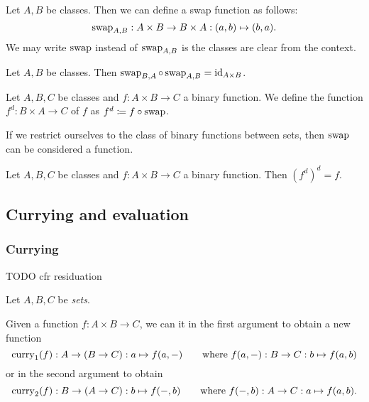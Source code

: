 Let $A,B$ be classes. Then we can define a swap function as follows:
\[ \operatorname{swap}_{A,B}: A\times B \to B\times A: (a,b) \mapsto (b,a). \]
We may write $\operatorname{swap}$ instead of $\operatorname{swap}_{A,B}$ is the classes are clear from the context.

\begin{lemma}
Let $A, B$ be classes. Then $\operatorname{swap}_{B,A}\circ \operatorname{swap}_{A,B} = \operatorname{id}_{A\times B}$.
\end{lemma}

\begin{definition}
Let $A, B, C$ be classes and $f: A\times B \to C$ a binary function. We define the  function $f^d: B\times A \to C$ of $f$ as $f^d \coloneqq f\circ \operatorname{swap}$. 
\end{definition}

If we restrict ourselves to the class of binary functions between sets, then $\operatorname{swap}$ can be considered a function.

\begin{lemma}
Let $A, B, C$ be classes and $f: A\times B \to C$ a binary function. Then $(f^d)^d = f$.
\end{lemma}

\subsection{Currying and evaluation}
\subsubsection{Currying}
TODO cfr residuation

\begin{definition}
Let $A,B,C$ be \emph{sets}.

Given a function $f: A\times B \to C$, we can  it in the first argument to obtain a new function
\[ \operatorname{curry}_1(f): A \to (B\to C): a\mapsto f(a,-) \qquad \text{where $f(a,-): B \to C: b\mapsto f(a,b)$} \]
or in the second argument to obtain
\[ \operatorname{curry}_2(f): B \to (A\to C): b\mapsto f(-,b) \qquad \text{where $f(-,b): A \to C: a\mapsto f(a,b)$}. \]
\end{definition}

